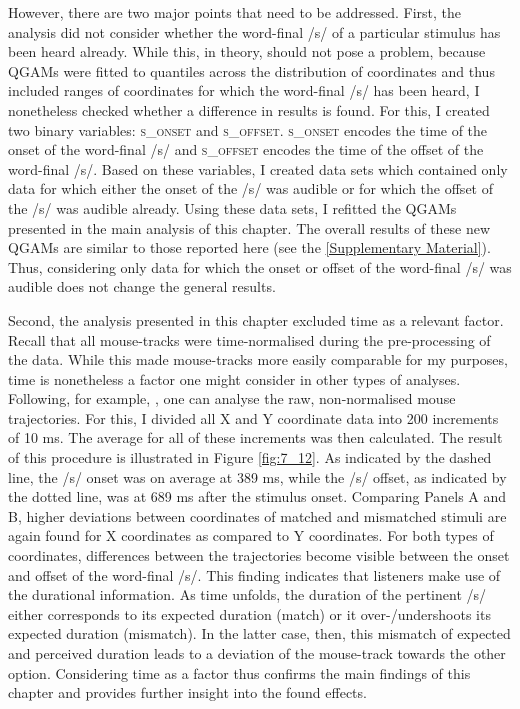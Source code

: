 However, there are two major points that need to be addressed. First, the analysis did not consider whether the word-final /s/ of a particular stimulus has been heard already. While this, in theory, should not pose a problem, because QGAMs were fitted to quantiles across the distribution of coordinates and thus included ranges of coordinates for which the word-final /s/ has been heard, I nonetheless checked whether a difference in results is found. For this, I created two binary variables: \textsc{s\_onset} and \textsc{s\_offset}. \textsc{s\_onset} encodes the time of the onset of the word-final /s/ and \textsc{s\_offset} encodes the time of the offset of the word-final /s/. Based on these variables, I created data sets which contained only data for which either the onset of the /s/ was audible or for which the offset of the /s/ was audible already. Using these data sets, I refitted the QGAMs presented in the main analysis of this chapter. The overall results of these new QGAMs are similar to those reported here (see the \ref{Supplementary Material}). Thus, considering only data for which the onset or offset of the word-final /s/ was audible does not change the general results.

Second, the analysis presented in this chapter excluded time as a relevant factor. Recall that all mouse-tracks were time-normalised during the pre-processing of the data. While this made mouse-tracks more easily comparable for my purposes, time is nonetheless a factor one might consider in other types of analyses. Following, for example, \citet{Blazej2015}, one can analyse the raw, non-normalised mouse trajectories. For this, I divided all X and Y coordinate data into 200 increments of 10 ms. The average for all of these increments was then calculated. The result of this procedure is illustrated in Figure \ref{fig:7_12}. As indicated by the dashed line, the /s/ onset was on average at 389 ms, while the /s/ offset, as indicated by the dotted line, was at 689 ms after the stimulus onset. Comparing Panels A and B, higher deviations between coordinates of matched and mismatched stimuli are again found for X coordinates as compared to Y coordinates. For both types of coordinates, differences between the trajectories become visible between the onset and offset of the word-final /s/. This finding indicates that listeners make use of the durational information. As time unfolds, the duration of the pertinent /s/ either corresponds to its expected duration (match) or it over-/undershoots its expected duration (mismatch). In the latter case, then, this mismatch of expected and perceived duration leads to a deviation of the mouse-track towards the other option. Considering time as a factor thus confirms the main findings of this chapter and provides further insight into the found effects.

